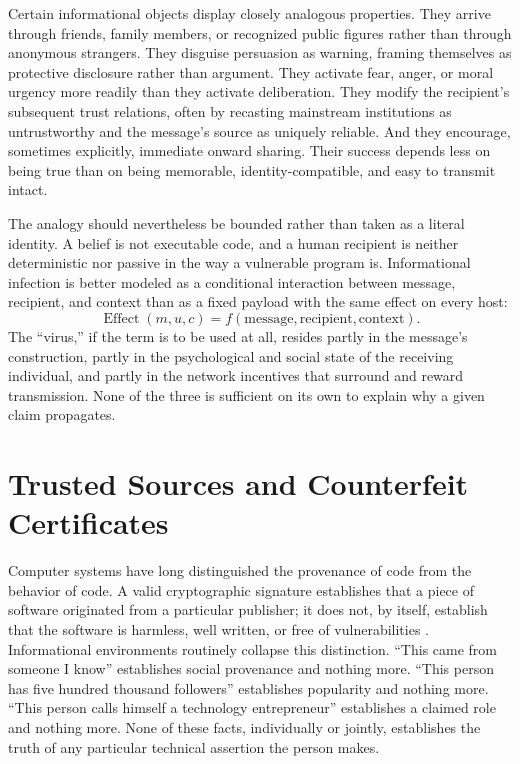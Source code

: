 \documentclass[11pt]{article}
\begin{document}
Certain informational objects display closely analogous properties. They arrive through friends, family members, or recognized public figures rather than through anonymous strangers. They disguise persuasion as warning, framing themselves as protective disclosure rather than argument. They activate fear, anger, or moral urgency more readily than they activate deliberation. They modify the recipient's subsequent trust relations, often by recasting mainstream institutions as untrustworthy and the message's source as uniquely reliable. And they encourage, sometimes explicitly, immediate onward sharing. Their success depends less on being true than on being memorable, identity-compatible, and easy to transmit intact.

The analogy should nevertheless be bounded rather than taken as a literal identity. A belief is not executable code, and a human recipient is neither deterministic nor passive in the way a vulnerable program is. Informational infection is better modeled as a conditional interaction between message, recipient, and context than as a fixed payload with the same effect on every host:
\[
\operatorname{Effect}(m,u,c) = f(\text{message}, \text{recipient}, \text{context}).
\]
The ``virus,'' if the term is to be used at all, resides partly in the message's construction, partly in the psychological and social state of the receiving individual, and partly in the network incentives that surround and reward transmission. None of the three is sufficient on its own to explain why a given claim propagates.

\section{Trusted Sources and Counterfeit Certificates}

Computer systems have long distinguished the provenance of code from the behavior of code. A valid cryptographic signature establishes that a piece of software originated from a particular publisher; it does not, by itself, establish that the software is harmless, well written, or free of vulnerabilities \cite{cooper2018signing}. Informational environments routinely collapse this distinction. ``This came from someone I know'' establishes social provenance and nothing more. ``This person has five hundred thousand followers'' establishes popularity and nothing more. ``This person calls himself a technology entrepreneur'' establishes a claimed role and nothing more. None of these facts, individually or jointly, establishes the truth of any particular technical assertion the person makes.
\end{document}
